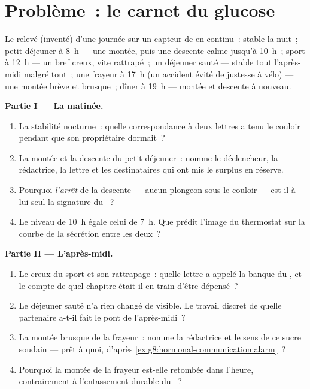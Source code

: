 \section{Problème~: le carnet du glucose}

\begin{problem}\label{pb:g8:hormonal-communication:1}
Le relevé (inventé) d'une journée sur un capteur de 
en continu~: stable la nuit~; petit-déjeuner à 8~h --- une
montée, puis une descente calme jusqu'à 10~h~; sport à
12~h --- un bref creux, vite rattrapé~; un déjeuner sauté
--- stable tout l'après-midi malgré tout~; une frayeur à
17~h (un accident évité de justesse à vélo) --- une montée
brève et brusque~; dîner à 19~h --- montée et descente à
nouveau.

\medskip\noindent\textbf{Partie I --- La matinée.}
\begin{enumerate}
  \item La stabilité nocturne~: quelle correspondance à
        deux lettres a tenu le couloir pendant que son
        propriétaire dormait~?
  \item La montée et la descente du petit-déjeuner~: nomme
        le déclencheur, la rédactrice, la lettre et les
        destinataires qui ont mis le surplus en réserve.
  \item Pourquoi \emph{l'arrêt} de la descente --- aucun
        plongeon sous le couloir --- est-il à lui seul la
        signature du ~?
  \item Le niveau de 10~h égale celui de 7~h. Que prédit
        l'image du thermostat sur la courbe de la sécrétion
        entre les deux~?
\end{enumerate}

\medskip\noindent\textbf{Partie II --- L'après-midi.}
\begin{enumerate}[resume]
  \item Le creux du sport et son rattrapage~: quelle lettre
        a appelé la banque du , et le compte de quel
        chapitre était-il en train d'être dépensé~?
  \item Le déjeuner sauté n'a rien changé de visible. Le
        travail discret de quelle  partenaire a-t-il
        fait le pont de l'après-midi~?
  \item La montée brusque de la frayeur~: nomme la
        rédactrice et le sens de ce sucre soudain --- prêt à
        quoi, d'après
        \cref{ex:g8:hormonal-communication:alarm}~?
  \item Pourquoi la montée de la frayeur est-elle retombée
        dans l'heure, contrairement à l'entassement durable
        du ~?
\end{enumerate}


\end{problem}
